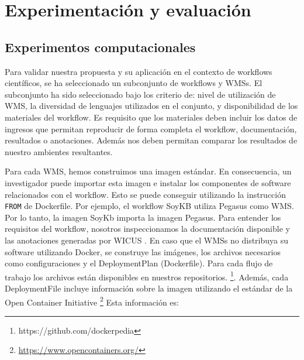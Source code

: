\chapter{Experimentación y evaluación}
\section{Experimentos computacionales}\label{s5.1}

Para validar nuestra propuesta y su aplicación en el contexto de workflows científicos, se ha seleccionado un subconjunto de workflows y WMSs. 
El subconjunto ha sido seleccionado bajo los criterio de: nivel de utilización de WMS, la diversidad de lenguajes utilizados en el conjunto, y disponibilidad de los materiales del workflow. 
Es requisito que los materiales deben incluir los datos de ingresos que permitan reproducir de forma completa el workflow, documentación, resultados o anotaciones. Además nos deben permitan comparar los resultados de nuestro ambientes resultantes.

Para cada WMS, hemos construimos una imagen estándar. En consecuencia, un investigador puede importar esta imagen e instalar los componentes de software relacionados con el workflow.
Esto se puede conseguir utilizando la instrucción \texttt{FROM} de Dockerfile. Por ejemplo, el workflow SoyKB utiliza Pegasus como WMS. Por lo tanto, la imagen SoyKb importa la imagen Pegasus.
Para entender los requisitos del workflow, nosotros inspeccionamos la documentación disponible y las anotaciones generadas por WICUS \cite{santana2017reproducibility}.
En caso que el WMSs no distribuya su software utilizando Docker, se construye las imágenes, los archivos necesarios como configuraciones y el DeploymentPlan (Dockerfile). Para cada flujo de trabajo los archivos están disponibles en nuestros repositorios. \footnote{https://github.com/dockerpedia}.
Además, cada DeploymentFile incluye información sobre la imagen utilizando el estándar de la Open Container Initiative \footnote{\url{https://www.opencontainers.org/}} Esta información es:
 

